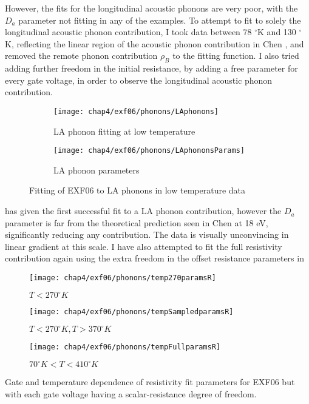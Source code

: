 \documentclass[../Matt_Gebert_Honours_Thesis.tex]{subfiles}
\begin{document}
However, the fits for the longitudinal acoustic phonons are very poor, with the $D_a$ parameter not fitting in any of the examples. To attempt to fit to solely the longitudinal acoustic phonon contribution, I took data between 78 $^\circ$K and 130 $^\circ$K, reflecting the linear region of the acoustic phonon contribution in Chen \etal{}, and removed the remote phonon contribution $\rho_B$ to the fitting function. 
I also tried adding further freedom in the initial resistance, by adding a free parameter for every gate voltage, in order to observe the longitudinal acoustic phonon contribution. 

\begin{figure}[H]
	\begin{subfigure}[t]{0.5\textwidth}
		\centering
		\texttt{[image: chap4/exf06/phonons/LAphonons]}
		\caption{LA phonon fitting at low temperature}
	\end{subfigure}
	\begin{subfigure}[t]{0.5\textwidth}
		\centering
		\texttt{[image: chap4/exf06/phonons/LAphononsParams]}
		\caption{LA phonon parameters}
	\end{subfigure}
	\caption[EXF06 LA phonon fitting]{Fitting of EXF06 to LA phonons in low temperature data}\label{fig:exf06_laphonon}
\end{figure}

 has given the first successful fit to a LA phonon contribution, however the $D_a$ parameter is far from the theoretical prediction seen in Chen \cite{chen_intrinsic_2008} at 18 eV, significantly reducing any contribution. The data is visually unconvincing in linear gradient at this scale. 
I have also attempted to fit the full resistivity contribution again using the extra freedom in the offset resistance parameters in 

\begin{table}[H]
	\begin{subfigure}[b]{0.3\textwidth}
		\texttt{[image: chap4/exf06/phonons/temp270paramsR]}
		\caption{$T < 270 ^\circ K$}\label{fig:phononB270}
	\end{subfigure}\hspace{0.03\textwidth}
	\begin{subfigure}[b]{0.3\textwidth}
		\texttt{[image: chap4/exf06/phonons/tempSampledparamsR]}
		\caption{$T < 270 ^\circ K, T > 370 ^\circ K$}\label{fig:phononBSamp}
	\end{subfigure}\hspace{0.03\textwidth}
	\begin{subfigure}[b]{0.3\textwidth}
		\texttt{[image: chap4/exf06/phonons/tempFullparamsR]}
		\caption{$70 ^\circ K < T < 410 ^\circ K$}\label{fig:phononBFull}
	\end{subfigure}
	\caption[Gate and temperature dependence of resistivity fit parameters for EXF06 with R flexibility]{Gate and temperature dependence of resistivity fit parameters for EXF06 but with each gate voltage having a scalar-resistance degree of freedom.} \label{fig:exf_temp_gateRparams}
\end{table}
\end{document}
